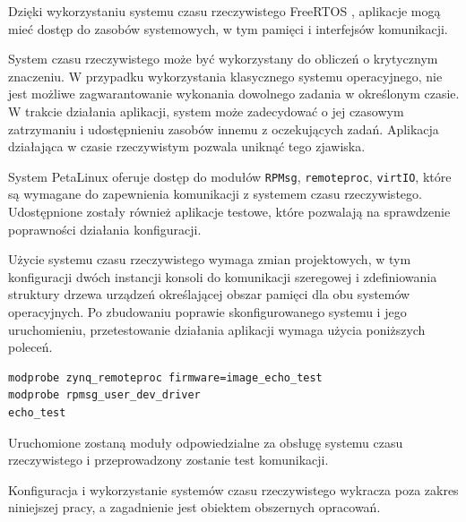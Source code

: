 Dzięki wykorzystaniu systemu czasu rzeczywistego FreeRTOS \cite{freeRTOS-home}, aplikacje mogą mieć dostęp do zasobów systemowych, w tym pamięci i interfejsów komunikacji.

System czasu rzeczywistego może być wykorzystany do obliczeń o krytycznym znaczeniu. W przypadku wykorzystania klasycznego systemu operacyjnego, nie jest możliwe zagwarantowanie wykonania dowolnego zadania w określonym czasie. W trakcie działania aplikacji, system może zadecydować o jej czasowym zatrzymaniu i udostępnieniu zasobów innemu z oczekujących zadań. Aplikacja działająca w czasie rzeczywistym pozwala uniknąć tego zjawiska.

System PetaLinux oferuje dostęp do modułów \texttt{RPMsg}, \texttt{remoteproc}, \texttt{virtIO}, które są wymagane do zapewnienia komunikacji z systemem czasu rzeczywistego. Udostępnione zostały również aplikacje testowe, które pozwalają na sprawdzenie poprawności działania konfiguracji.

Użycie systemu czasu rzeczywistego wymaga zmian projektowych, w tym konfiguracji dwóch instancji konsoli do komunikacji szeregowej i zdefiniowania struktury drzewa urządzeń określającej obszar pamięci dla obu systemów operacyjnych. Po zbudowaniu poprawie skonfigurowanego systemu i jego uruchomieniu, przetestowanie działania aplikacji wymaga użycia poniższych poleceń.

\begin{lstlisting}[breaklines=true]
modprobe zynq_remoteproc firmware=image_echo_test
modprobe rpmsg_user_dev_driver
echo_test
\end{lstlisting}

Uruchomione zostaną moduły odpowiedzialne za obsługę systemu czasu rzeczywistego i przeprowadzony zostanie test komunikacji.

Konfiguracja i wykorzystanie systemów czasu rzeczywistego wykracza poza zakres niniejszej pracy, a zagadnienie jest obiektem obszernych opracowań. \cite{adam-taylor-openamp,zynq-openamp-gsg}